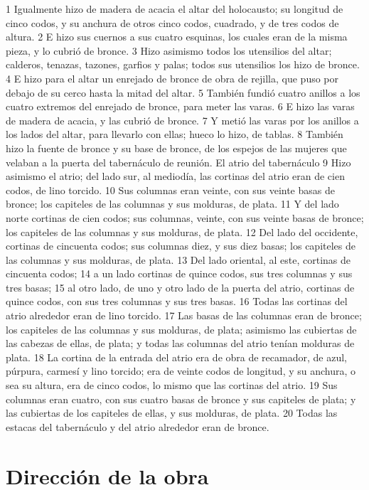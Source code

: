 1 Igualmente hizo de madera de acacia el altar del holocausto; su longitud de cinco codos, y su anchura de otros cinco codos, cuadrado, y de tres codos de altura.
2 E hizo sus cuernos a sus cuatro esquinas, los cuales eran de la misma pieza, y lo cubrió de bronce.
3 Hizo asimismo todos los utensilios del altar; calderos, tenazas, tazones, garfios y palas; todos sus utensilios los hizo de bronce.
4 E hizo para el altar un enrejado de bronce de obra de rejilla, que puso por debajo de su cerco hasta la mitad del altar.
5 También fundió cuatro anillos a los cuatro extremos del enrejado de bronce, para meter las varas.
6 E hizo las varas de madera de acacia, y las cubrió de bronce.
7 Y metió las varas por los anillos a los lados del altar, para llevarlo con ellas; hueco lo hizo, de tablas.
8 También hizo la fuente de bronce y su base de bronce, de los espejos de las mujeres que velaban a la puerta del tabernáculo de reunión.
El atrio del tabernáculo
9 Hizo asimismo el atrio; del lado sur, al mediodía, las cortinas del atrio eran de cien codos, de lino torcido.
10 Sus columnas eran veinte, con sus veinte basas de bronce; los capiteles de las columnas y sus molduras, de plata.
11 Y del lado norte cortinas de cien codos;  sus columnas, veinte, con sus veinte basas de bronce; los capiteles de las columnas y sus molduras, de plata.
12 Del lado del occidente, cortinas de cincuenta codos;  sus columnas diez, y sus diez basas; los capiteles de las columnas y sus molduras, de plata.
13 Del lado oriental, al este, cortinas de cincuenta codos;
14 a un lado cortinas de quince codos,  sus tres columnas y sus tres basas;
15 al otro lado, de uno y otro lado de la puerta del atrio, cortinas de quince codos,  con sus tres columnas y sus tres basas.
16 Todas las cortinas del atrio alrededor eran de lino torcido.
17 Las basas de las columnas eran de bronce; los capiteles de las columnas y sus molduras, de plata; asimismo las cubiertas de las cabezas de ellas, de plata; y todas las columnas del atrio tenían molduras de plata.
18 La cortina de la entrada del atrio era de obra de recamador, de azul, púrpura, carmesí y lino torcido; era de veinte codos   de longitud, y su anchura, o sea su altura, era de cinco codos, lo mismo que las cortinas del atrio.
19 Sus columnas eran cuatro, con sus cuatro basas de bronce y sus capiteles de plata; y las cubiertas de los capiteles de ellas, y sus molduras, de plata.
20 Todas las estacas del tabernáculo y del atrio alrededor eran de bronce.

\section{Dirección de la obra}

